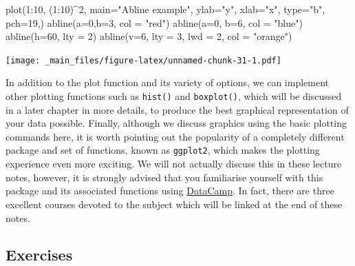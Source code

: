 \documentclass[
]{book}
\newenvironment{Shaded}{\begin{snugshade}}{\end{snugshade}}
\newcommand{\AttributeTok}[1]{\textcolor[rgb]{0.77,0.63,0.00}{#1}}
\newcommand{\DecValTok}[1]{\textcolor[rgb]{0.00,0.00,0.81}{#1}}
\newcommand{\FunctionTok}[1]{\textcolor[rgb]{0.00,0.00,0.00}{#1}}
\newcommand{\NormalTok}[1]{#1}
\newcommand{\SpecialCharTok}[1]{\textcolor[rgb]{0.00,0.00,0.00}{#1}}
\newcommand{\StringTok}[1]{\textcolor[rgb]{0.31,0.60,0.02}{#1}}
\theoremstyle{definition}
\theoremstyle{definition}
\theoremstyle{definition}
\theoremstyle{definition}
\theoremstyle{remark}
\begin{document}
\begin{Shaded}
\begin{Highlighting}[]
\FunctionTok{plot}\NormalTok{(}\DecValTok{1}\SpecialCharTok{:}\DecValTok{10}\NormalTok{, (}\DecValTok{1}\SpecialCharTok{:}\DecValTok{10}\NormalTok{)}\SpecialCharTok{\^{}}\DecValTok{2}\NormalTok{,}
     \AttributeTok{main=}\StringTok{"Abline example"}\NormalTok{,}
     \AttributeTok{ylab=}\StringTok{"y"}\NormalTok{,}
     \AttributeTok{xlab=}\StringTok{"x"}\NormalTok{,}
     \AttributeTok{type=}\StringTok{"b"}\NormalTok{,}
     \AttributeTok{pch=}\DecValTok{19}\NormalTok{,)}
\FunctionTok{abline}\NormalTok{(}\AttributeTok{a=}\DecValTok{0}\NormalTok{,}\AttributeTok{b=}\DecValTok{3}\NormalTok{, }\AttributeTok{col =} \StringTok{"red"}\NormalTok{)}
\FunctionTok{abline}\NormalTok{(}\AttributeTok{a=}\DecValTok{0}\NormalTok{, }\AttributeTok{b=}\DecValTok{6}\NormalTok{, }\AttributeTok{col =} \StringTok{"blue"}\NormalTok{)}
\FunctionTok{abline}\NormalTok{(}\AttributeTok{h=}\DecValTok{60}\NormalTok{, }\AttributeTok{lty =} \DecValTok{2}\NormalTok{)}
\FunctionTok{abline}\NormalTok{(}\AttributeTok{v=}\DecValTok{6}\NormalTok{, }\AttributeTok{lty =} \DecValTok{3}\NormalTok{, }\AttributeTok{lwd =} \DecValTok{2}\NormalTok{, }\AttributeTok{col =} \StringTok{"orange"}\NormalTok{)}
\end{Highlighting}
\end{Shaded}

\texttt{[image: \_main\_files/figure-latex/unnamed-chunk-31-1.pdf]}

In addition to the plot function and its variety of options, we can implement other plotting functions such as \texttt{hist()} and \texttt{boxplot()}, which will be discussed in a later chapter in more details, to produce the best graphical representation of your data possible. Finally, although we discuss graphics using the basic plotting commands here, it is worth pointing out the popularity of a completely different package and set of functions, known as \texttt{ggplot2}, which makes the plotting experience even more exciting. We will not actually discuss this in these lecture notes, however, it is strongly advised that you familiarise yourself with this package and its associated functions using \href{www.datacamp.com}{DataCamp}. In fact, there are three excellent courses devoted to the subject which will be linked at the end of these notes.

\hypertarget{exercises-2}{%
\subsection{Exercises}\label{exercises-2}}
\end{document}
